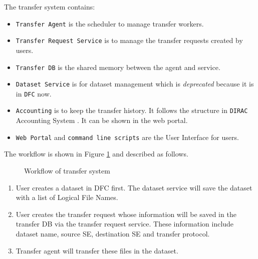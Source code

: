 The transfer system contains:

\begin{itemize}
    \item {\tt Transfer Agent} is the scheduler to manage transfer workers.
    \item {\tt Transfer Request Service} is to manage the transfer requests
          created by users.
    \item {\tt Transfer DB} is the shared memory between the agent and 
          service. 
    \item {\tt Dataset Service} is for dataset management which is 
          {\em deprecated} because it is in {\tt DFC} now.
    \item {\tt Accounting} is to keep the transfer history.
          It follows the structure in {\tt DIRAC} Accounting System
          \cite{bib:diracacct}.
          It can be shown in the web portal.
    \item {\tt Web Portal} and {\tt command line scripts} are the 
          User Interface for users.
\end{itemize}

The workflow is shown in Figure \ref{fig:workflow} and described as follows.
\begin{figure}[htbp]
    
    \caption{Workflow of transfer system} \label{fig:workflow}
\end{figure}

\begin{enumerate}
\item User creates a dataset in DFC first. The dataset service
    will save the dataset with a list of Logical File Names.
\item User creates the transfer request
whose information will be saved in the transfer DB via
the transfer request service. These information include
dataset name, source SE, destination SE and transfer protocol.
\item Transfer agent will transfer these files in the dataset.
\end{enumerate}

